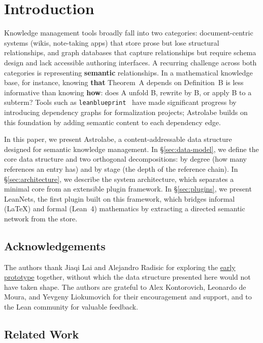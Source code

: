 \section{Introduction}
\label{sec:introduction}

Knowledge management tools broadly fall into two categories: document-centric systems (wikis, note-taking apps) that store prose but lose structural relationships, and graph databases that capture relationships but require schema design and lack accessible authoring interfaces. A recurring challenge across both categories is representing \textbf{semantic} relationships. In a mathematical knowledge base, for instance, knowing \textbf{that} Theorem~A depends on Definition~B is less informative than knowing \textbf{how}: does A unfold B, rewrite by B, or apply B to a subterm? Tools such as \texttt{leanblueprint}~\cite{Massot2020} have made significant progress by introducing dependency graphs for formalization projects; Astrolabe builds on this foundation by adding semantic content to each dependency edge.

In this paper, we present Astrolabe, a content-addressable data structure designed for semantic knowledge management. In \S\ref{sec:data-model}, we define the core data structure and two orthogonal decompositions: by degree (how many references an entry has) and by stage (the depth of the reference chain). In \S\ref{sec:architecture}, we describe the system architecture, which separates a minimal core from an extensible plugin framework. In \S\ref{sec:plugins}, we present LeanNets, the first plugin built on this framework, which bridges informal (\LaTeX) and formal (Lean~4) mathematics by extracting a directed semantic network from the store.

\subsection*{Acknowledgements}

The authors thank Jiaqi Lai and Alejandro Radisic for exploring the \href{https://github.com/Xinze-Li-Moqian/Astrolabe}{early prototype} together, without which the data structure presented here would not have taken shape. The authors are grateful to Alex Kontorovich, Leonardo de Moura, and Yevgeny Liokumovich for their encouragement and support, and to the Lean community for valuable feedback.

\subsection{Related Work}

